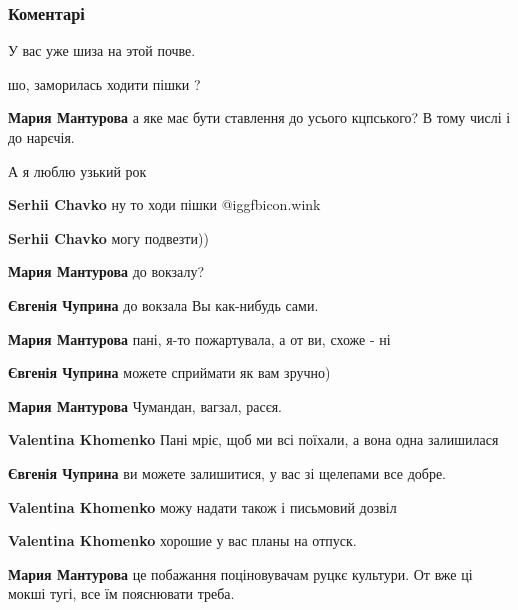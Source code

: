  
 
 
 
 
\subsubsection{Коментарі}

\begin{itemize} %
У вас уже шиза на этой почве.

\begin{itemize} %
шо, заморилась ходити пішки ?

\textbf{Мария Мантурова} а яке має бути ставлення до усього кцпського? В тому числі і до нарєчія.
\end{itemize} %

А я люблю узький рок

\begin{itemize} %
\textbf{Serhii Chavko} ну то ходи пішки  @igg{fbicon.wink} 

\textbf{Serhii Chavko} могу подвезти))

\begin{itemize} %
\textbf{Мария Мантурова} до вокзалу?

\textbf{Євгенія Чуприна} до вокзала Вы как-нибудь сами.

\textbf{Мария Мантурова} пані, я-то пожартувала, а от ви, схоже - ні

\textbf{Євгенія Чуприна} можете сприймати як вам зручно)

\textbf{Мария Мантурова} Чумандан, вагзал, расєя.

\textbf{Valentina Khomenko} Пані мріє, щоб ми всі поїхали, а вона одна залишилася

\textbf{Євгенія Чуприна} ви можете залишитися, у вас зі щелепами все добре.

\textbf{Valentina Khomenko} можу надати також і письмовий дозвіл
\end{itemize} %

\textbf{Valentina Khomenko} хорошие у вас планы на отпуск.

\begin{itemize} %
\textbf{Мария Мантурова} це побажання поціновувачам руцкє культури. От вже ці мокші тугі, все їм пояснювати треба.
\end{itemize} %

\end{itemize} %

\end{itemize} %
